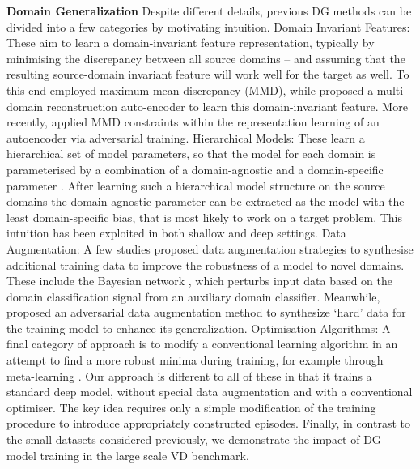 \documentclass[10pt,twocolumn,letterpaper]{article}
\newcommand{\keypoint}[1]{\vspace{0.1cm}\noindent\textbf{#1}\quad}
\begin{document}
\keypoint{Domain Generalization} Despite different details, previous DG methods can be divided into a few categories by motivating intuition. Domain Invariant Features: These aim to learn a domain-invariant feature representation, typically by minimising the discrepancy between all source domains -- and assuming that the resulting source-domain invariant feature will work well for the target as well. To this end  \cite{muandet2013domaingeneralization} employed maximum mean discrepancy (MMD), while \cite{Ghifary2015mtae} proposed a multi-domain reconstruction auto-encoder to learn this domain-invariant feature. More recently, \cite{Li2018mmdaae} applied MMD constraints within the representation learning of an autoencoder via adversarial training. Hierarchical Models: These learn a hierarchical set of model parameters, so that the model for each domain is parameterised by a combination of a domain-agnostic and a domain-specific parameter \cite{Khosla12undobias,Li2017dg}. After learning such a hierarchical model structure on the source domains the domain agnostic parameter can be extracted as the model with the least domain-specific bias, that is most likely to work on a target problem. This intuition has been exploited in both shallow \cite{Khosla12undobias} and deep \cite{Li2017dg} settings. Data Augmentation: A few studies proposed data augmentation strategies to synthesise additional training data to improve the robustness of a model to novel domains. These include the Bayesian network \cite{shankar2018generalizing}, which perturbs input data based on the domain classification signal from an auxiliary domain classifier.  Meanwhile, \cite{riccardo_nips18} proposed an adversarial data augmentation method to synthesize `hard' data for the training model to enhance its generalization. Optimisation Algorithms: A final category of approach is to modify a conventional learning algorithm in an attempt to find a more robust minima during training, for example through meta-learning \cite{Li2018MLDG}. Our approach is different to all of these in that it trains a standard deep model, without special data augmentation and with a conventional optimiser. The key idea requires only a simple modification of the training procedure to introduce appropriately constructed episodes. Finally, in contrast to the small datasets considered previously, we demonstrate the impact of DG model training in the large scale VD benchmark.
\end{document}
